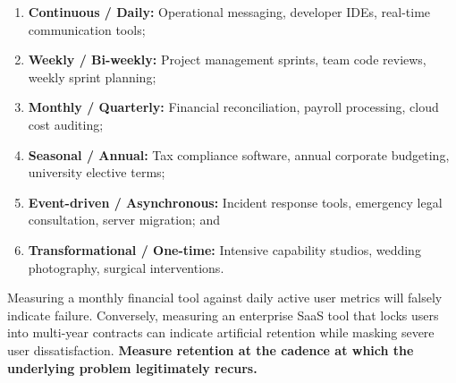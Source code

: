 \begin{enumerate}
    \item \textbf{Continuous / Daily:} Operational messaging, developer IDEs, real-time communication tools;
    \item \textbf{Weekly / Bi-weekly:} Project management sprints, team code reviews, weekly sprint planning;
    \item \textbf{Monthly / Quarterly:} Financial reconciliation, payroll processing, cloud cost auditing;
    \item \textbf{Seasonal / Annual:} Tax compliance software, annual corporate budgeting, university elective terms;
    \item \textbf{Event-driven / Asynchronous:} Incident response tools, emergency legal consultation, server migration; and
    \item \textbf{Transformational / One-time:} Intensive capability studios, wedding photography, surgical interventions.
\end{enumerate}

Measuring a monthly financial tool against daily active user metrics will falsely indicate failure. Conversely, measuring an enterprise SaaS tool that locks users into multi-year contracts can indicate artificial retention while masking severe user dissatisfaction. \textbf{Measure retention at the cadence at which the underlying problem legitimately recurs.}
